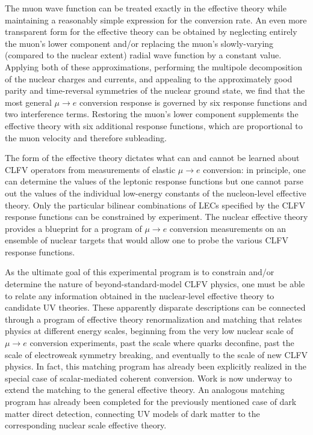 \documentclass[12pt,letterpaper]{book}
\begin{document}
The muon wave function can be treated exactly in the effective theory while maintaining a reasonably simple expression for the conversion rate. An even more transparent form for the effective theory can be obtained by neglecting entirely the muon's lower component and/or replacing the muon's slowly-varying (compared to the nuclear extent) radial wave function by a constant value. Applying both of these approximations, performing the multipole decomposition of the nuclear charges and currents, and appealing to the approximately good parity and time-reversal symmetries of the nuclear ground state, we find that the most general $\mu\rightarrow e$ conversion response is governed by six response functions and two interference terms. Restoring the muon's lower component supplements the effective theory with six additional response functions, which are proportional to the muon velocity and therefore subleading.

The form of the effective theory dictates what can and cannot be learned about CLFV operators from measurements of elastic $\mu\rightarrow e$ conversion: in principle, one can determine the values of the leptonic response functions but one cannot parse out the values of the individual low-energy constants of the nucleon-level effective theory. Only the particular bilinear combinations of LECs specified by the CLFV response functions can be constrained by experiment. The nuclear effective theory provides a blueprint for a program of $\mu\rightarrow e$ conversion measurements on an ensemble of nuclear targets that would allow one to probe the various CLFV response functions.

As the ultimate goal of this experimental program is to constrain and/or determine the nature of beyond-standard-model CLFV physics, one must be able to relate any information obtained in the nuclear-level effective theory to candidate UV theories. These apparently disparate descriptions can be connected through a program of effective theory renormalization and matching that relates physics at different energy scales, beginning from the very low nuclear scale of $\mu\rightarrow e$ conversion experiments, past the scale where quarks deconfine, past the scale of electroweak symmetry breaking, and eventually to the scale of new CLFV physics. In fact, this matching program has already been explicitly realized in the special case of scalar-mediated coherent conversion. Work is now underway to extend the matching to the general effective theory. An analogous matching program has already been completed for the previously mentioned case of dark matter direct detection, connecting UV models of dark matter to the corresponding nuclear scale effective theory. 
\end{document}
